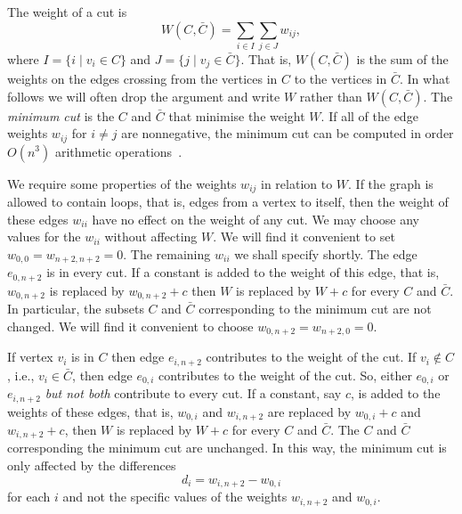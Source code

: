 \documentclass[final,leqno]{siamltex}
\begin{document}
The weight of a cut is
\[
W(C,\bar{C}) = \sum_{i \in I} \sum_{j \in J} w_{ij}, 
\]
where $I = \{ i \mid v_i \in C\}$ and $J = \{j \mid v_j \in \bar{C}\}$.  That is, $W(C,\bar{C})$ is the sum of the weights on the edges crossing from the vertices in $C$ to the vertices in $\bar{C}$.  In what follows we will often drop the argument and write $W$ rather than $W(C,\bar{C})$.  The \emph{minimum cut} is the $C$ and $\bar{C}$ that minimise the weight $W$.  If all of the edge weights $w_{ij}$ for $i \neq j$ are nonnegative, the minimum cut can be computed in 
order $O(n^3)$ arithmetic operations~\cite{Cormen2001,Even_graph_algorithms_1979}.

We require some properties of the weights $w_{ij}$ in relation to $W$.  If the graph is allowed to contain loops, that is, edges from a vertex to itself, then the weight of these edges $w_{ii}$ have no effect on the weight of any cut.  We may choose any values for the $w_{ii}$ without affecting $W$.  We will find it convenient to set $w_{0,0} = w_{n+2,n+2} = 0$.  The remaining $w_{ii}$ we shall specify shortly.  The edge $e_{0,n+2}$ is in every cut.  If a constant is added to the weight of this edge, that is, $w_{0,n+2}$ is replaced by $w_{0,n+2} + c$ then $W$ is replaced by $W + c$ for every $C$ and $\bar{C}$.  In particular, the subsets $C$ and $\bar{C}$ corresponding to the minimum cut are not changed.  We will find it convenient to choose $w_{0,n+2} = w_{n+2,0} = 0$.  

If vertex $v_i$ is in $C$ then edge $e_{i,n+2}$ contributes to the weight of the cut.  If $v_i \notin C$, i.e., $v_i \in \bar{C}$, then edge $e_{0,i}$ contributes to the weight of the cut.  So, either $e_{0,i}$ or $e_{i,n+2}$ \emph{but not both} contribute to every cut.  If a constant, say $c$, is added to the weights of these edges, that is, $w_{0,i}$ and $w_{i,n+2}$ are replaced by $w_{0,i} + c$ and $w_{i,n+2} + c$, then $W$ is replaced by $W + c$ for every $C$ and $\bar{C}$.  The $C$ and $\bar{C}$ corresponding the minimum cut are unchanged.  In this way, the minimum cut is only affected by the differences 
\[
d_i = w_{i,n+2} - w_{0,i}
\]
for each $i$ and not the specific values of the weights $w_{i,n+2}$ and $w_{0,i}$.  %

\end{document}

